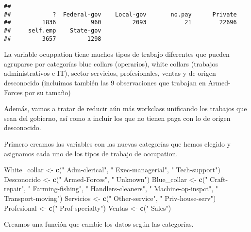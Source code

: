 \documentclass[]{article}
\newenvironment{Shaded}{\begin{snugshade}}{\end{snugshade}}
\newcommand{\KeywordTok}[1]{\textcolor[rgb]{0.13,0.29,0.53}{\textbf{#1}}}
\newcommand{\NormalTok}[1]{#1}
\newcommand{\StringTok}[1]{\textcolor[rgb]{0.31,0.60,0.02}{#1}}
\begin{document}
\begin{verbatim}
## 
##            ?  Federal-gov    Local-gov       no.pay      Private 
##         1836          960         2093           21        22696 
##     self.emp    State-gov 
##         3657         1298
\end{verbatim}

La variable ocuppation tiene muchos tipos de trabajo diferentes que
pueden agruparse por categorías blue collars (operarios), white collars
(trabajos administrativos e IT), sector servicios, profesionales, ventas
y de origen desconocido (incluimos también las 9 observaciones que
trabajan en Armed-Forces por su tamaño)

Además, vamos a tratar de reducir aún más workclass unificando los
trabajos que sean del gobierno, así como a incluir los que no tienen
paga con lo de origen desconocido.

Primero creamos las variables con las nuevas categorías que hemos
elegido y asignamos cada uno de los tipos de trabajo de occupation.

\begin{Shaded}
\begin{Highlighting}[]
\NormalTok{White\_collar \textless{}{-}}\StringTok{ }\KeywordTok{c}\NormalTok{(}\StringTok{" Adm{-}clerical"}\NormalTok{, }\StringTok{" Exec{-}managerial"}\NormalTok{, }\StringTok{" Tech{-}support"}\NormalTok{)}
\NormalTok{Desconocido \textless{}{-}}\StringTok{ }\KeywordTok{c}\NormalTok{(}\StringTok{" Armed{-}Forces"}\NormalTok{, }\StringTok{" Unknown"}\NormalTok{)}
\NormalTok{Blue\_collar \textless{}{-}}\StringTok{ }\KeywordTok{c}\NormalTok{(}\StringTok{" Craft{-}repair"}\NormalTok{, }\StringTok{" Farming{-}fishing"}\NormalTok{, }\StringTok{" Handlers{-}cleaners"}\NormalTok{, }\StringTok{" Machine{-}op{-}inspct"}\NormalTok{, }\StringTok{" Transport{-}moving"}\NormalTok{)}
\NormalTok{Servicios \textless{}{-}}\StringTok{ }\KeywordTok{c}\NormalTok{(}\StringTok{" Other{-}service"}\NormalTok{, }\StringTok{" Priv{-}house{-}serv"}\NormalTok{)}
\NormalTok{Profesional \textless{}{-}}\StringTok{ }\KeywordTok{c}\NormalTok{(}\StringTok{" Prof{-}specialty"}\NormalTok{)}
\NormalTok{Ventas \textless{}{-}}\StringTok{ }\KeywordTok{c}\NormalTok{(}\StringTok{" Sales"}\NormalTok{)}
\end{Highlighting}
\end{Shaded}

Creamos una función que cambie los datos según las categorías.
\end{document}
